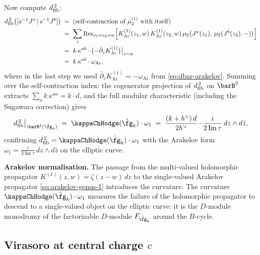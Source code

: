 \begin{example}
Now compute $d_{\mathrm{fib}}^{\,2}$:
\begin{align}\label{eq:dfib-sq-affine}
 d_{\mathrm{fib}}^{\,2}\bigl([s^{-1}J^a \,|\, s^{-1}J^b]\bigr)
 &\;=\;
 \text{(self-contraction of $\mu_2^{(1)}$ with itself)}
 \notag\\
 &\;=\;
 \sum_c
 \operatorname{Res}_{z_1=z_2=w}\Bigl[
 K^{(1)}_{\mathrm{Ar}}(z_1,w)\,
 K^{(1)}_{\mathrm{Ar}}(z_2,w)\,
 \mu_2\bigl(J^a(z_1),\, \mu_2(J^b(z_2), -)\bigr)
 \Bigr]
 \notag\\
 &\;=\;
 k\,\kappa^{ab} \cdot
 \bigl(-\bar\partial_z K^{(1)}_{\mathrm{Ar}}\bigr)\big|_{z=w}
 \notag\\
 &\;=\;
 k\,\kappa^{ab} \cdot \omega_{\mathrm{Ar}},
\end{align}
where in the last step we used $\bar\partial_z K^{(1)}_{\mathrm{Ar}}
= -\omega_{\mathrm{Ar}}$ from \eqref{eq:dbar-arakelov}. Summing
over the self-contraction index: the cogenerator projection of
$d_{\mathrm{fib}}^{\,2}$ on $\barB^2$ extracts $\sum_a k\,\kappa^{aa} =
k \cdot d$, and the full modular characteristic (including the
Sugawara correction) gives
\[
 \dfib^{\,2}\big|_{\barB^2(\hat\fg_k)}
 \;=\;
 \kappaChHodge(\hat\fg_k) \cdot \omega_1
 \;=\;
 \frac{(k+h^\vee)\,d}{2h^\vee} \cdot
 \frac{i}{2\operatorname{Im}\tau}\,
 dz \wedge d\bar z,
\]
confirming $\dfib^{\,2} = \kappaChHodge(\hat\fg_k)\cdot\omega_1$ with the
Arakelov form $\omega_1 = \frac{i}{2\operatorname{Im}\tau}\,
dz \wedge d\bar z$ on the elliptic curve.

\smallskip\noindent
\textbf{Arakelov normalisation.}
The passage from the multi-valued holomorphic propagator
$K^{(1)}(z,w) = \zeta(z-w)\,dz$ to the single-valued Arakelov
propagator \eqref{eq:arakelov-genus-1} introduces the curvature.
The curvature $\kappaChHodge(\hat\fg_k)\cdot\omega_1$ measures the
failure of the holomorphic propagator to descend to a single-valued
object on the elliptic curve: it is the $D$-module monodromy of the
factorizable $D$-module $F_{\hat\fg_k}$ around the $B$-cycle.
\end{example}

\subsection{Virasoro at central charge $c$}
\label{subsec:virasoro-SC}


